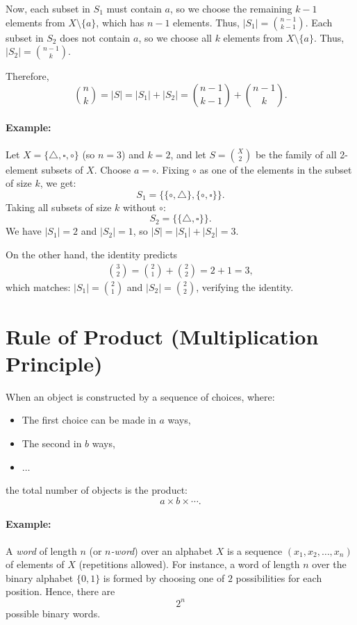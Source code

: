 \documentclass[docmute]{article}
\begin{document}
Now,  
each subset in \( S_1 \) must contain \( a \), so we choose the remaining \( k-1 \) elements from \( X \setminus \{a\} \), which has \( n-1 \) elements. Thus, \( |S_1| = \binom{n-1}{k-1} \).  
Each subset in \( S_2 \) does not contain \( a \), so we choose all \( k \) elements from \( X \setminus \{a\} \). Thus, \( |S_2| = \binom{n-1}{k} \).  

Therefore,  
\[
\binom{n}{k} = |S| = |S_1| + |S_2| = \binom{n-1}{k-1} + \binom{n-1}{k}.
\]

\paragraph{Example:}
Let \( X = \{ \triangle, \square, \circ \} \) (so \( n = 3 \)) and \( k = 2 \), and let \( S = \binom{X}{2} \) be the family of all 2-element subsets of \( X \). Choose \( a = \circ \).
Fixing \( \circ \) as one of the elements in the subset of size \( k \), we get:
  \[
  S_1 = \{\{\circ, \triangle\}, \{\circ, \square\}\}.
  \]
Taking all subsets of size \( k \) without \( \circ \):
  \[
  S_2 = \{\{\triangle, \square\}\}.
  \]
We have \( |S_1| = 2 \) and \( |S_2| = 1 \), so \( |S| = |S_1| + |S_2| = 3 \).

\noindent On the other hand, the identity predicts
\begin{align*}
\binom{3}{2} = \binom{2}{1} + \binom{2}{2} = 2 + 1 = 3,
\end{align*}
which matches: \( |S_1| = \binom{2}{1} \) and \( |S_2| = \binom{2}{2} \), verifying the identity.

\section{Rule of Product (Multiplication Principle)}
When an object is constructed by a sequence of choices, where:
\begin{itemize}[nosep]
    \item The first choice can be made in $a$ ways,
    \item The second in $b$ ways,
    \item $\ldots$
\end{itemize}
the total number of objects is the product:
\[
a \times b \times \cdots.
\]

\paragraph{Example:}
A \emph{word} of length $n$ (or \emph{$n$-word}) over an alphabet $X$ is a sequence $(x_1, x_2, \dots, x_n)$ of elements of $X$ (repetitions allowed). For instance, a word of length $n$ over the binary alphabet $\{0,1\}$ is formed by choosing one of $2$ possibilities for each position. Hence, there are
\[
2^n
\]
possible binary words.
\end{document}
